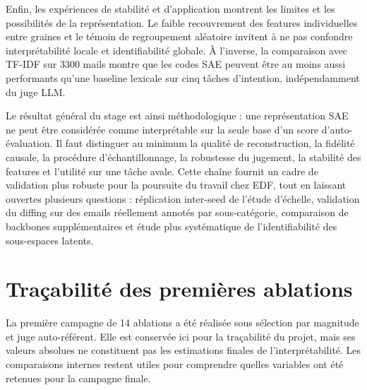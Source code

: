 \documentclass[11pt]{article}
\begin{document}
Enfin, les expériences de stabilité et d'application montrent les limites et les
possibilités de la représentation. Le faible recouvrement des features individuelles
entre graines et le témoin de regroupement aléatoire invitent à ne pas confondre
interprétabilité locale et identifiabilité globale. À l'inverse, la comparaison avec
TF-IDF sur 3300 mails montre que les codes SAE peuvent être au moins aussi performants
qu'une baseline lexicale sur cinq tâches d'intention, indépendamment du juge LLM.

Le résultat général du stage est ainsi méthodologique : une représentation SAE ne peut
être considérée comme interprétable sur la seule base d'un score d'auto-évaluation.
Il faut distinguer au minimum la qualité de reconstruction, la fidélité causale,
la procédure d'échantillonnage, la robustesse du jugement, la stabilité des features
et l'utilité sur une tâche avale. Cette chaîne fournit un cadre de validation plus
robuste pour la poursuite du travail chez EDF, tout en laissant ouvertes plusieurs
questions : réplication inter-seed de l'étude d'échelle, validation du diffing sur des
emails réellement annotés par sous-catégorie, comparaison de backbones supplémentaires
et étude plus systématique de l'identifiabilité des sous-espaces latents.

\appendix
\section{Traçabilité des premières ablations}

La première campagne de 14 ablations a été réalisée sous sélection par magnitude et
juge auto-référent. Elle est conservée ici pour la traçabilité du projet, mais ses
valeurs absolues ne constituent pas les estimations finales de l'interprétabilité.
Les comparaisons internes restent utiles pour comprendre quelles variables ont été
retenues pour la campagne finale.
\end{document}
